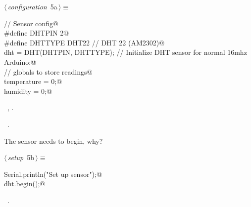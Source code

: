 \documentclass[a4paper, 12pt]{article}
\begin{document}
\begin{flushleft} \small
\begin{minipage}{\linewidth}\label{scrap3}\raggedright\small
{}$\langle\,${\itshape configuration}\nobreak\ {\footnotesize{5a}}$\,\rangle\equiv$
\vspace{-1ex}
\begin{list}{}{\setlength{\leftmargin}{1em}} \item
\mbox{}\lstinline@// Sensor config@\\
\mbox{}\lstinline@#define DHTPIN 2@\\
\mbox{}\lstinline@#define DHTTYPE DHT22   // DHT 22  (AM2302)@\\
\mbox{}\lstinline@DHT dht = DHT(DHTPIN, DHTTYPE); // Initialize DHT sensor for normal 16mhz Arduino:@\\
\mbox{}\lstinline@// globals to store readings@\\
\mbox{}\lstinline@float temperature = 0;@\\
\mbox{}\lstinline@float humidity = 0;@\\
\mbox{}{\NWsep}
\end{list}
\vspace{-1ex}
\vspace{-1ex}
\footnotesize
\begin{list}{}{\setlength{\itemsep}{-\parsep}\setlength{\itemindent}{-\leftmargin}}
\item \NWtxtMacroDefBy\ , .
\item \NWtxtMacroRefIn\ .
\end{list}
\end{minipage}
\end{flushleft}

The sensor needs to begin, why?

\begin{flushleft} \small
\begin{minipage}{\linewidth}\label{scrap4}\raggedright\small
{}$\langle\,${\itshape setup}\nobreak\ {\footnotesize{5b}}$\,\rangle\equiv$
\vspace{-1ex}
\begin{list}{}{\setlength{\leftmargin}{1em}} \item
\mbox{}\lstinline@  Serial.println("Set up sensor");@\\
\mbox{}\lstinline@  dht.begin();@\\
\mbox{}{\NWsep}
\end{list}
\vspace{-1ex}
\vspace{-1ex}
\footnotesize
\begin{list}{}{\setlength{\itemsep}{-\parsep}\setlength{\itemindent}{-\leftmargin}}
\item \NWtxtMacroRefIn\ .
\end{list}
\end{minipage}
\end{flushleft}
\end{document}
